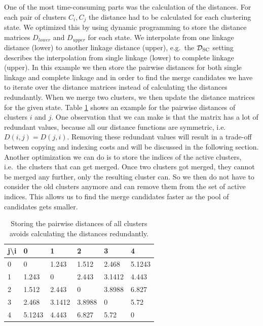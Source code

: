 One of the most time-consuming parts was the calculation of the distances. For each pair of clusters $C_i, C_j$ the distance had to be calculated for each clustering state. We optimized this by using dynamic programming to store the distance matrices $D_{lower}$ and $D_{upper}$ for each state. We interpolate from one linkage distance (lower) to another linkage distance (upper), e.g.\ the $\mathcal{D}_\text{SC}$ setting describes the interpolation from single linkage (lower) to complete linkage (upper). In this example we then store the pairwise distances for both single linkage and complete linkage and in order to find the merge candidates we have to iterate over the distance matrices instead of calculating the distances redundantly. When we merge two clusters, we then update the distance matrices for the given state. Table \ref{dp:distances} shows an example for the pairwise distances of clusters $i$ and $j$. One observation that we can make is that the matrix has a lot of redundant values, because all our distance functions are symmetric, i.e.\ $D(i,j) = D(j,i)$. Removing these redundant values will result in a trade-off between copying and indexing costs and will be discussed in the following section. Another optimization we can do is to store the indices of the active clusters, i.e.\ the clusters that can get merged. Once two clusters got merged, they cannot be merged any further, only the resulting cluster can. So we then do not have to consider the old clusters anymore and can remove them from the set of active indices. This allows us to find the merge candidates faster as the pool of candidates gets smaller.

\begin{table}[H]
    \centering
    \begin{tabular}{|l | l l l l l|}
    \hline
    j\textbackslash i & 0 & 1 & 2 & 3 & 4\\ \hline
    0 & 0 & 1.243 & 1.512 & 2.468 & 5.1243\\
    1 & 1.243 & 0 & 2.443 & 3.1412 & 4.443\\
    2 & 1.512 & 2.443 & 0 & 3.8988 & 6.827\\
    3 & 2.468 & 3.1412 & 3.8988 & 0 & 5.72\\
    4 & 5.1243 & 4.443 & 6.827 & 5.72 & 0\\ \hline
    \end{tabular}
    \caption{Storing the pairwise distances of all clusters avoids calculating the distances redundantly.}
    \label{dp:distances}
\end{table}

